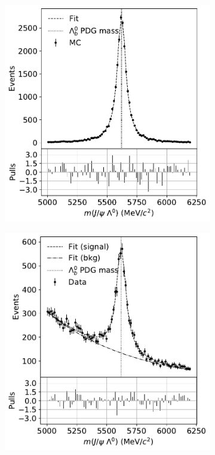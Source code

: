 \begin{figure}[t]
	\centering
	\begin{subfigure}{.45\textwidth}
		\includegraphics[width=\textwidth]{graphics/04-event_selection/MC_lambdab_hard_fit.pdf}
		\caption{}
		\label{fig:4:mc_fit}
	\end{subfigure}
	\begin{subfigure}{.45\textwidth}
		\includegraphics[width=\textwidth]{graphics/04-event_selection/data_lambdab_hard_fit.pdf}

\end{subfigure}
\end{figure}
